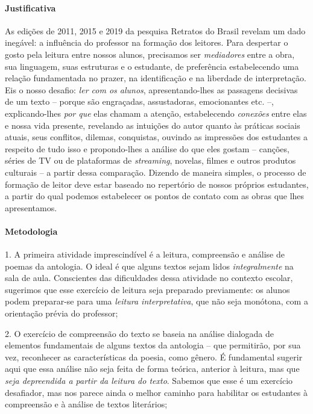 \documentclass[11pt]{extarticle}
\begin{document}
\paragraph{Justificativa} As edições de 2011, 2015 e 2019 da pesquisa
Retratos do Brasil revelam um dado inegável: a influência do professor
na formação dos leitores. Para despertar o gosto pela leitura entre
nossos alunos, precisamos ser \emph{mediadores} entre a obra, sua
linguagem, suas estruturas e o estudante, de preferência estabelecendo
uma relação fundamentada no prazer, na identificação e na liberdade de
interpretação. Eis o nosso desafio: \emph{ler com os alunos},
apresentando-lhes as passagens decisivas de um texto -- porque são
engraçadas, assustadoras, emocionantes etc. --, explicando-lhes
\emph{por que} elas chamam a atenção, estabelecendo \emph{conexões}
entre elas e nossa vida presente, revelando as intuições do autor quanto
às práticas sociais atuais, seus conflitos, dilemas, conquistas, ouvindo
as impressões dos estudantes a respeito de tudo isso e propondo-lhes a
análise do que eles gostam -- canções, séries de TV ou de plataformas de
\emph{streaming}, novelas, filmes e outros produtos culturais -- a
partir dessa comparação. Dizendo de maneira simples, o processo de
formação de leitor deve estar baseado no repertório de nossos próprios
estudantes, a partir do qual podemos estabelecer os pontos de contato
com as obras que lhes apresentamos.

\paragraph{Metodologia}

1. A primeira atividade imprescindível é a leitura, compreensão e
análise de poemas da antologia. O ideal é que alguns textos sejam lidos
\emph{integralmente} na sala de aula. Conscientes das dificuldades dessa
atividade no contexto escolar, sugerimos que esse exercício de leitura
seja preparado previamente: os alunos podem preparar-se para uma
\emph{leitura interpretativa}, que não seja monótona, com a orientação
prévia do professor;

2. O exercício de compreensão do texto se baseia na análise dialogada de
elementos fundamentais de alguns textos da antologia -- que permitirão,
por sua vez, reconhecer as características da poesia, como gênero. É
fundamental sugerir aqui que essa análise não seja feita de forma
teórica, anterior à leitura, mas que \emph{seja depreendida a partir da
leitura do texto}. Sabemos que esse é um exercício desafiador, mas nos
parece ainda o melhor caminho para habilitar os estudantes à compreensão
e à análise de textos literários;
\end{document}
